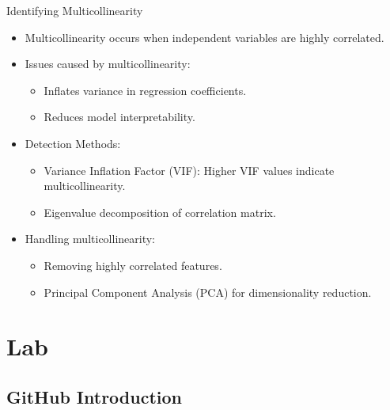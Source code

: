 \documentclass[aspectratio=169,xcolor=dvipsnames]{beamer}
\begin{document}
\begin{frame}{Identifying Multicollinearity}
\begin{itemize}
    \setlength\itemsep{0.25cm}
    \item Multicollinearity occurs when independent variables are highly correlated.
    \item Issues caused by multicollinearity:
    \begin{itemize}
        \item Inflates variance in regression coefficients.
        \item Reduces model interpretability.
    \end{itemize}
    \item Detection Methods:
    \begin{itemize}
        \item Variance Inflation Factor (VIF): Higher VIF values indicate multicollinearity.
        \item Eigenvalue decomposition of correlation matrix.
    \end{itemize}
    \item Handling multicollinearity:
    \begin{itemize}
        \item Removing highly correlated features.
        \item Principal Component Analysis (PCA) for dimensionality reduction.
    \end{itemize}
\end{itemize}
\end{frame}
\section{Lab}
\subsection{GitHub Introduction}
\end{document}
